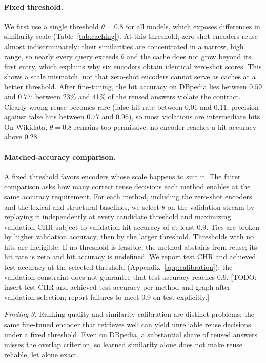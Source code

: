 \documentclass[runningheads]{llncs}
\newcommand{\hp}[1]{{\color{red!75!black}#1}}
\begin{document}
\paragraph{Fixed threshold.}
We first use a single threshold $\theta = 0.8$ for all models, which exposes
differences in similarity scale (Table~\ref{tab:caching}). At this threshold,
zero-shot encoders reuse almost indiscriminately: their similarities are
concentrated in a narrow, high range, so nearly every query exceeds $\theta$
and the cache does not grow beyond its first entry, which explains why six
encoders obtain identical zero-shot scores. This shows a scale mismatch, not
that zero-shot encoders cannot serve as caches at a better threshold. After
fine-tuning, the hit accuracy on DBpedia lies between $0.59$ and $0.77$: between
23\% and 41\% of the reused answers violate the contract. Clearly wrong reuse
becomes rare (false hit rate between $0.01$ and $0.11$, precision against false
hits between $0.77$ and $0.96$), so most violations are intermediate hits. On
Wikidata, $\theta = 0.8$ remains too permissive: no encoder reaches a hit
accuracy above $0.28$.

\paragraph{Matched-accuracy comparison.}
A fixed threshold favors encoders whose scale happens to suit it. The fairer
comparison asks how many correct reuse decisions each method enables at the
same accuracy requirement. For each method, including the zero-shot encoders
and the lexical and structural baselines, we select $\theta$ on the validation
stream by replaying it independently at every candidate threshold and
maximizing validation CHR subject to validation hit accuracy of at least $0.9$.
Ties are broken by higher validation accuracy, then by the larger threshold.
Thresholds with no hits are ineligible. If no threshold is feasible, the
method abstains from reuse; its hit rate is zero and hit accuracy is undefined.
We report test CHR and achieved test accuracy at the selected threshold
(Appendix~\ref{app:calibration}); the validation constraint does not guarantee
that test accuracy reaches $0.9$.
\hp{[TODO: insert test CHR and achieved test accuracy per method and graph
after validation selection; report failures to meet 0.9 on test explicitly.]}

\textit{Finding 3.} Ranking quality and similarity calibration are distinct
problems: the same fine-tuned encoder that retrieves well can yield unreliable
reuse decisions under a fixed threshold. Even on DBpedia, a substantial share
of reused answers misses the overlap criterion, so learned similarity alone
does not make reuse reliable, let alone exact.
\end{document}
